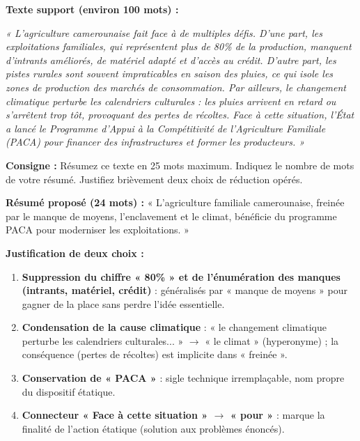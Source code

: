 \documentclass[11pt]{article}
\begin{document}
\begin{exercice}
\textbf{Texte support (environ 100 mots) :}

\emph{« L'agriculture camerounaise fait face à de multiples défis. D'une part, les exploitations familiales, qui représentent plus de 80\% de la production, manquent d'intrants améliorés, de matériel adapté et d'accès au crédit. D'autre part, les pistes rurales sont souvent impraticables en saison des pluies, ce qui isole les zones de production des marchés de consommation. Par ailleurs, le changement climatique perturbe les calendriers culturales : les pluies arrivent en retard ou s'arrêtent trop tôt, provoquant des pertes de récoltes. Face à cette situation, l'État a lancé le Programme d'Appui à la Compétitivité de l'Agriculture Familiale (PACA) pour financer des infrastructures et former les producteurs. »}

\textbf{Consigne :} Résumez ce texte en 25 mots maximum. Indiquez le nombre de mots de votre résumé. Justifiez brièvement deux choix de réduction opérés.
\end{exercice}

\begin{corrige}
\textbf{Résumé proposé (24 mots) :}
« L'agriculture familiale camerounaise, freinée par le manque de moyens, l'enclavement et le climat, bénéficie du programme PACA pour moderniser les exploitations. »

\textbf{Justification de deux choix :}
\begin{enumerate}
\item \textbf{Suppression du chiffre « 80\% » et de l'énumération des manques (intrants, matériel, crédit)} : généralisés par « manque de moyens » pour gagner de la place sans perdre l'idée essentielle.
\item \textbf{Condensation de la cause climatique} : « le changement climatique perturbe les calendriers culturales... » $\rightarrow$ « le climat » (hyperonyme) ; la conséquence (pertes de récoltes) est implicite dans « freinée ».
\item \textbf{Conservation de « PACA »} : sigle technique irremplaçable, nom propre du dispositif étatique.
\item \textbf{Connecteur « Face à cette situation » $\rightarrow$ « pour »} : marque la finalité de l'action étatique (solution aux problèmes énoncés).
\end{enumerate}
\end{corrige}
\end{document}
